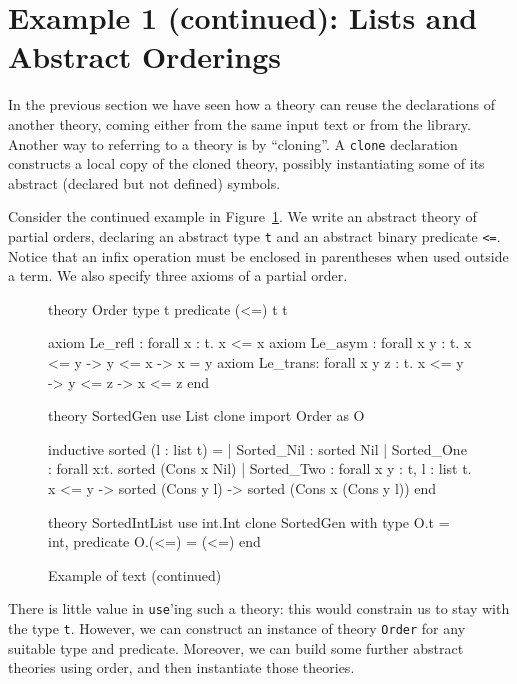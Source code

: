 \section{Example 1 (continued): Lists and Abstract Orderings}

In the previous section we have seen how a theory can reuse the
declarations of another theory, coming either from the same input
text or from the library. Another way to referring to a theory is
by ``cloning''. A \texttt{clone} declaration constructs a local
copy of the cloned theory, possibly instantiating some of its
abstract (\ie declared but not defined) symbols.

Consider the continued example in Figure~\ref{fig:tutorial2}.
We write an abstract theory of partial orders, declaring an
abstract type \texttt{t} and an abstract binary predicate
\texttt{<=}. Notice that an infix operation must be enclosed
in parentheses when used outside a term. We also specify
three axioms of a partial order.

\begin{figure}
\centering
\begin{whycode}
theory Order
  type t
  predicate (<=) t t

  axiom Le_refl : forall x : t. x <= x
  axiom Le_asym : forall x y : t. x <= y -> y <= x -> x = y
  axiom Le_trans: forall x y z : t. x <= y -> y <= z -> x <= z
end

theory SortedGen
  use List
  clone import Order as O

  inductive sorted (l : list t) =
    | Sorted_Nil :
        sorted Nil
    | Sorted_One :
        forall x:t. sorted (Cons x Nil)
    | Sorted_Two :
        forall x y : t, l : list t.
        x <= y -> sorted (Cons y l) -> sorted (Cons x (Cons y l))
end

theory SortedIntList
  use int.Int
  clone SortedGen with type O.t = int, predicate O.(<=) = (<=)
end
\end{whycode}
\vspace*{-1em}%
\caption{Example of \why text (continued)}
\label{fig:tutorial2}
\end{figure}

There is little value in \texttt{use}'ing such a theory: this
would constrain us to stay with the type \texttt{t}. However,
we can construct an instance of theory \texttt{Order} for
any suitable type and predicate. Moreover, we can build some
further abstract theories using order, and then instantiate
those theories.


